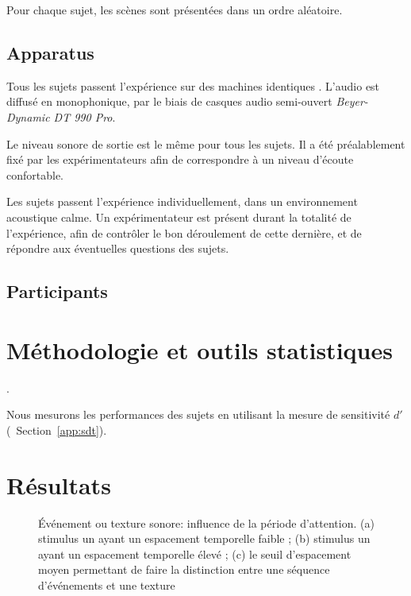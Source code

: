 Pour chaque sujet, les scènes sont présentées dans un ordre aléatoire. 

\subsection{Apparatus}

Tous les sujets passent l'expérience sur des machines identiques . L'audio est diffusé en monophonique, par le biais de casques audio semi-ouvert \emph{Beyer-Dynamic DT 990 Pro}. 

Le niveau sonore de sortie est le même pour tous les sujets. Il a été préalablement fixé par les expérimentateurs afin de correspondre à un niveau d'écoute confortable.

Les sujets passent l'expérience individuellement, dans un environnement acoustique calme. Un expérimentateur est présent durant la totalité de l'expérience, afin de contrôler le bon déroulement de cette dernière, et de répondre aux éventuelles questions des sujets.

\subsection{Participants}


\section{Méthodologie et outils statistiques}

.

Nous mesurons les performances des sujets en utilisant la mesure de sensitivité $d'$ (\cf~Section~\ref{app:sdt}).
 
\section{Résultats}

\begin{figure}[t]
        \myfloatalign
         \par
        \caption[Événement ou texture sonore: influence de la période d'attention]{Événement ou texture sonore: influence de la période d'attention. (a) stimulus un ayant un espacement temporelle faible ; (b) stimulus un ayant un espacement temporelle élevé ; (c) le seuil d'espacement moyen permettant de faire la distinction entre une séquence d'événements et une texture }\label{fig:xptexture}
\end{figure}

